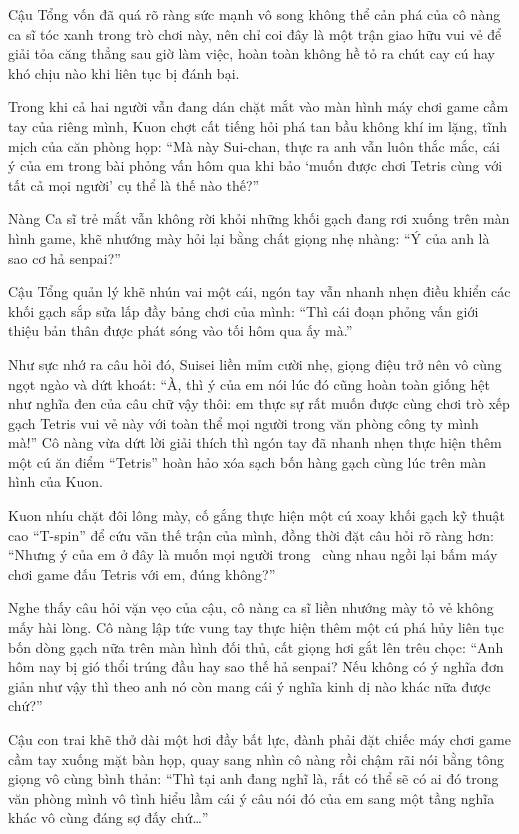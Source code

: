 \documentclass[../main.tex]{subfiles}
\begin{document}
Cậu Tổng vốn đã quá rõ ràng sức mạnh vô song không thể cản phá của cô nàng ca sĩ tóc xanh trong trò chơi này, nên chỉ coi đây là một trận giao hữu vui vẻ để giải tỏa căng thẳng sau giờ làm việc, hoàn toàn không hề tỏ ra chút cay cú hay khó chịu nào khi liên tục bị đánh bại.

Trong khi cả hai người vẫn đang dán chặt mắt vào màn hình máy chơi game cầm tay của riêng mình, Kuon chợt cất tiếng hỏi phá tan bầu không khí im lặng, tĩnh mịch của căn phòng họp: ``Mà này Sui-chan, thực ra anh vẫn luôn thắc mắc, cái ý của em trong bài phỏng vấn hôm qua khi bảo `muốn được chơi Tetris cùng với tất cả mọi người' cụ thể là thế nào thế?''

Nàng Ca sĩ trẻ mắt vẫn không rời khỏi những khối gạch đang rơi xuống trên màn hình game, khẽ nhướng mày hỏi lại bằng chất giọng nhẹ nhàng: ``Ý của anh là sao cơ hả senpai?''

Cậu Tổng quản lý khẽ nhún vai một cái, ngón tay vẫn nhanh nhẹn điều khiển các khối gạch sắp sửa lấp đầy bảng chơi của mình: ``Thì cái đoạn phỏng vấn giới thiệu bản thân được phát sóng vào tối hôm qua ấy mà.''

Như sực nhớ ra câu hỏi đó, Suisei liền mỉm cười nhẹ, giọng điệu trở nên vô cùng ngọt ngào và dứt khoát: ``À, thì ý của em nói lúc đó cũng hoàn toàn giống hệt như nghĩa đen của câu chữ vậy thôi: em thực sự rất muốn được cùng chơi trò xếp gạch Tetris vui vẻ này với toàn thể mọi người trong văn phòng công ty mình mà!'' Cô nàng vừa dứt lời giải thích thì ngón tay đã nhanh nhẹn thực hiện thêm một cú ăn điểm ``Tetris'' hoàn hảo xóa sạch bốn hàng gạch cùng lúc trên màn hình của Kuon.

Kuon nhíu chặt đôi lông mày, cố gắng thực hiện một cú xoay khối gạch kỹ thuật cao ``T-spin'' để cứu vãn thế trận của mình, đồng thời đặt câu hỏi rõ ràng hơn: ``Nhưng ý của em ở đây là muốn mọi người trong \hll\ cùng nhau ngồi lại bấm máy chơi game đấu Tetris với em, đúng không?''

Nghe thấy câu hỏi vặn vẹo của cậu, cô nàng ca sĩ liền nhướng mày tỏ vẻ không mấy hài lòng. Cô nàng lập tức vung tay thực hiện thêm một cú phá hủy liên tục bốn dòng gạch nữa trên màn hình đối thủ, cất giọng hơi gắt lên trêu chọc: ``Anh hôm nay bị gió thổi trúng đầu hay sao thế hả senpai? Nếu không có ý nghĩa đơn giản như vậy thì theo anh nó còn mang cái ý nghĩa kinh dị nào khác nữa được chứ?''

Cậu con trai khẽ thở dài một hơi đầy bất lực, đành phải đặt chiếc máy chơi game cầm tay xuống mặt bàn họp, quay sang nhìn cô nàng rồi chậm rãi nói bằng tông giọng vô cùng bình thản: ``Thì tại anh đang nghĩ là, rất có thể sẽ có ai đó trong văn phòng mình vô tình hiểu lầm cái ý câu nói đó của em sang một tầng nghĩa khác vô cùng đáng sợ đấy chứ\dots''
\end{document}
